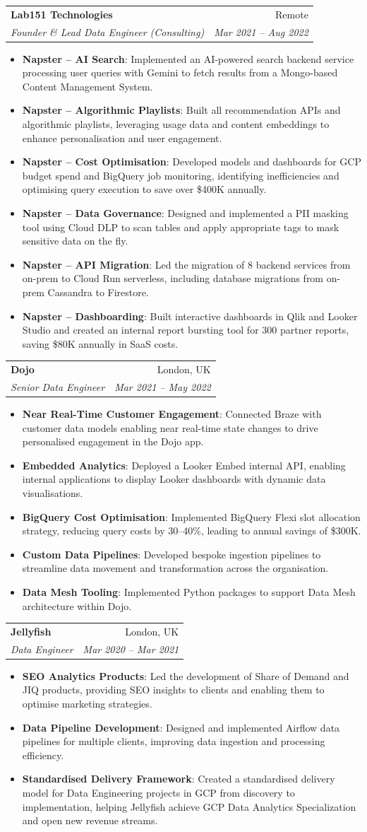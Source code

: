 \documentclass[letterpaper,11pt]{article}
\makeatletter
\newcommand{\resumeItem}[2]{
  \item\small{
    \textbf{#1}{: #2 \vspace{-2pt}}
  }
}
\newcommand{\resumeSubheading}[4]{
  \vspace{-1pt}\item
    \begin{tabular*}{0.97\textwidth}{l@{\extracolsep{\fill}}r}
      \textbf{#1} & #2 \\
      \textit{\small#3} & \textit{\small #4} \\
    \end{tabular*}\vspace{-5pt}
}
\newcommand{\resumeItemListStart}{\begin{itemize}}
\newcommand{\resumeItemListEnd}{\end{itemize}\vspace{-5pt}}
\makeatother
\begin{document}
    \resumeSubheading
      {Lab151 Technologies}{Remote}
      {Founder \& Lead Data Engineer (Consulting)}{Mar 2021 -- Aug 2022}
    \resumeItemListStart
      \resumeItem{Napster -- AI Search}{Implemented an AI-powered search backend service processing user queries with Gemini to fetch results from a Mongo-based Content Management System.}
      \resumeItem{Napster -- Algorithmic Playlists}{Built all recommendation APIs and algorithmic playlists, leveraging usage data and content embeddings to enhance personalisation and user engagement.}
      \resumeItem{Napster -- Cost Optimisation}{Developed models and dashboards for GCP budget spend and BigQuery job monitoring, identifying inefficiencies and optimising query execution to save over \$400K annually.}
      \resumeItem{Napster -- Data Governance}{Designed and implemented a PII masking tool using Cloud DLP to scan tables and apply appropriate tags to mask sensitive data on the fly.}
      \resumeItem{Napster -- API Migration}{Led the migration of 8 backend services from on-prem to Cloud Run serverless, including database migrations from on-prem Cassandra to Firestore.}
      \resumeItem{Napster -- Dashboarding}{Built interactive dashboards in Qlik and Looker Studio and created an internal report bursting tool for 300 partner reports, saving \$80K annually in SaaS costs.}
    \resumeItemListEnd

    \resumeSubheading
      {Dojo}{London, UK}
      {Senior Data Engineer}{Mar 2021 -- May 2022}
        \resumeItemListStart
         \resumeItem{Near Real-Time Customer Engagement}{Connected Braze with customer data models enabling near real-time state changes to drive personalised engagement in the Dojo app.}
          \resumeItem{Embedded Analytics}{Deployed a Looker Embed internal API, enabling internal applications to display Looker dashboards with dynamic data visualisations.}
          \resumeItem{BigQuery Cost Optimisation}{Implemented BigQuery Flexi slot allocation strategy, reducing query costs by 30--40\%, leading to annual savings of \$300K.}
          \resumeItem{Custom Data Pipelines}{Developed bespoke ingestion pipelines to streamline data movement and transformation across the organisation.}
          \resumeItem{Data Mesh Tooling}{Implemented Python packages to support Data Mesh architecture within Dojo.}
        \resumeItemListEnd

    \resumeSubheading
      {Jellyfish}{London, UK}
      {Data Engineer}{Mar 2020 -- Mar 2021}
        \resumeItemListStart
          \resumeItem{SEO Analytics Products}{Led the development of Share of Demand and JIQ products, providing SEO insights to clients and enabling them to optimise marketing strategies.}
          \resumeItem{Data Pipeline Development}{Designed and implemented Airflow data pipelines for multiple clients, improving data ingestion and processing efficiency.}
          \resumeItem{Standardised Delivery Framework}{Created a standardised delivery model for Data Engineering projects in GCP from discovery to implementation, helping Jellyfish achieve GCP Data Analytics Specialization and open new revenue streams.}
        \resumeItemListEnd
\end{document}
